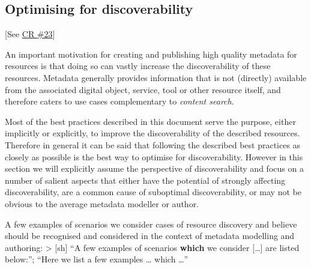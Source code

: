 \subsection{Optimising for
discoverability}\label{optimising-for-discoverability}

{[}See
\href{https://www.gitbook.com/book/cmdi-taskforce/cmdi-best-practices/changes/23}{CR
\#23}{]}

An important motivation for creating and publishing high quality
metadata for resources is that doing so can vastly increase the
discoverability of these resources. Metadata generally provides
information that is not (directly) available from the associated digital
object, service, tool or other resource itself, and therefore caters to
use cases complementary to \emph{content search}.

Most of the best practices described in this document serve the purpose,
either implicitly or explicitly, to improve the discoverability of the
described resources. Therefore in general it can be said that following
the described best practices as closely as possible is the best way to
optimise for discoverability. However in this section we will explicitly
assume the perspective of discoverability and focus on a number of
salient aspects that either have the potential of strongly affecting
discoverability, are a common cause of suboptimal discoverability, or
may not be obvious to the average metadata modeller or author.

A few examples of scenarios we consider cases of resource discovery and
believe should be recognised and considered in the context of metadata
modelling and authoring: \textgreater{} {[}sh{]} ``A few examples of
scenarios \textbf{which} we consider {[}\ldots{}{]} are listed below:'';
``Here we list a few examples \ldots{} which \ldots{}''

